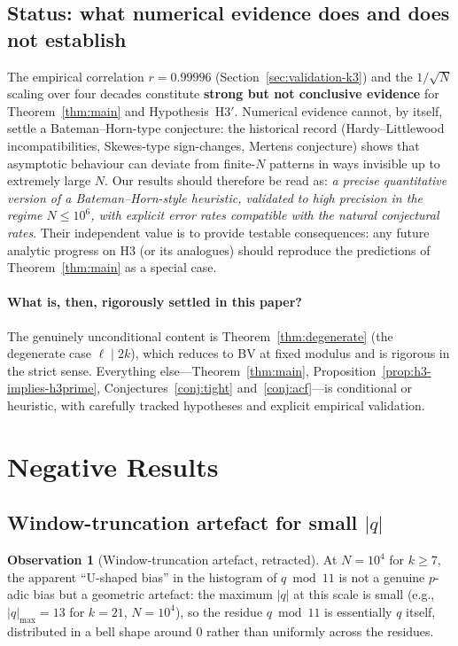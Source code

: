 \documentclass[11pt,a4paper]{article}
\theoremstyle{plain}
\theoremstyle{definition}
\newtheorem{observation}[theorem]{Observation}
\begin{document}
\subsection{Status: what numerical evidence does and does not establish}

The empirical correlation $r = 0.99996$ (Section~\ref{sec:validation-k3}) and
the $1/\sqrt{N}$ scaling over four decades constitute \textbf{strong but not
conclusive evidence} for Theorem~\ref{thm:main} and Hypothesis~H3$'$.
Numerical evidence cannot, by itself, settle a Bateman--Horn-type conjecture:
the historical record (Hardy--Littlewood incompatibilities, Skewes-type
sign-changes, Mertens conjecture) shows that asymptotic behaviour can deviate
from finite-$N$ patterns in ways invisible up to extremely large $N$. Our
results should therefore be read as: \emph{a precise quantitative version of
a Bateman--Horn-style heuristic, validated to high precision in the regime
$N \le 10^6$, with explicit error rates compatible with the natural conjectural
rates}. Their independent value is to provide testable consequences: any
future analytic progress on H3 (or its analogues) should reproduce the
predictions of Theorem~\ref{thm:main} as a special case.

\paragraph{What is, then, rigorously settled in this paper?}
The genuinely unconditional content is Theorem~\ref{thm:degenerate} (the
degenerate case $\ell \mid 2k$), which reduces to BV at fixed modulus and is
rigorous in the strict sense. Everything else---Theorem~\ref{thm:main},
Proposition~\ref{prop:h3-implies-h3prime}, Conjectures~\ref{conj:tight}
and~\ref{conj:acf}---is conditional or heuristic, with carefully tracked
hypotheses and explicit empirical validation.

\section{Negative Results}
\label{sec:negative}

\subsection{Window-truncation artefact for small $|q|$}

\begin{negativebox}
\begin{observation}[Window-truncation artefact, retracted]
At $N = 10^4$ for $k \ge 7$, the apparent ``U-shaped bias'' in the histogram
of $q \bmod 11$ is not a genuine $p$-adic bias but a geometric artefact: the
maximum $|q|$ at this scale is small (e.g., $|q|_{\max} = 13$ for $k = 21$,
$N = 10^4$), so the residue $q \bmod 11$ is essentially $q$ itself, distributed
in a bell shape around $0$ rather than uniformly across the residues.
\end{observation}
\end{negativebox}
\end{document}
